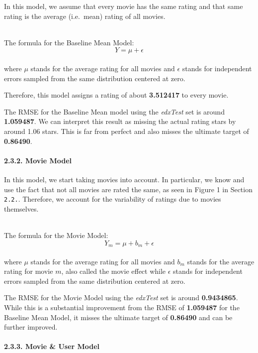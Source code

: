 \documentclass[
]{article}
\begin{document}
\hfill\break
\hfill\break
In this model, we assume that every movie has the same rating and that
same rating is the average (i.e.~mean) rating of all movies.\\
\strut \\
The formula for the Baseline Mean Model:\\
\[Y = \mu+ \epsilon\]\\
where \(\mu\) stands for the average rating for all movies and
\(\epsilon\) stands for independent errors sampled from the same
distribution centered at zero.

Therefore, this model assigns a rating of about \textbf{3.512417} to
every movie.

The RMSE for the Baseline Mean model using the \emph{edxTest} set is
around \textbf{1.059487}. We can interpret this result as missing the
actual rating stars by around 1.06 stars. This is far from perfect and
also misses the ultimate target of \textbf{0.86490}.

\hypertarget{movie-model}{%
\paragraph{2.3.2. Movie Model}\label{movie-model}}

\hfill\break
\hfill\break
In this model, we start taking movies into account. In particular, we
know and use the fact that not all movies are rated the same, as seen in
Figure 1 in Section \texttt{2.2.}. Therefore, we account for the
variability of ratings due to movies themselves.\\
\strut \\
The formula for the Movie Model:\\
\[Y_{m} = \mu+b_{m}+ \epsilon\]\\
where \(\mu\) stands for the average rating for all movies and \(b_m\)
stands for the average rating for movie \(m\), also called the movie
effect while \(\epsilon\) stands for independent errors sampled from the
same distribution centered at zero.

The RMSE for the Movie Model using the \emph{edxTest} set is around
\textbf{0.9434865}. While this is a substantial improvement from the
RMSE of \textbf{1.059487} for the Baseline Mean Model, it misses the
ultimate target of \textbf{0.86490} and can be further improved.

\hypertarget{movie-user-model}{%
\paragraph{2.3.3. Movie \& User Model}\label{movie-user-model}}
\end{document}
